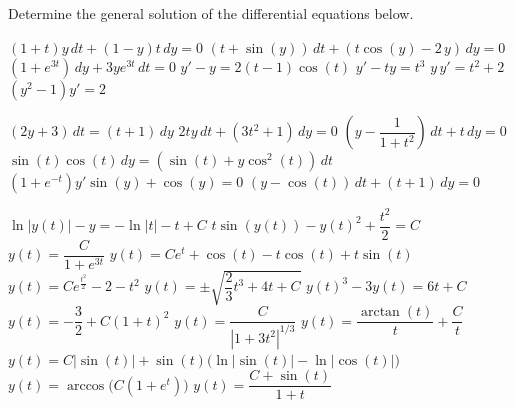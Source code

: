 \begin{Exercise} Determine the general solution of the differential equations below.
\begin{multicols}{2}

    \Question $\left( 1 + t \right) y \, d t + ( 1 - y ) t\, d y = 0$
    \Question $(t+\sin (y))\,d t+(t\cos (y) -2\,y)\,dy=0$
    \Question $\left( 1 + e^{3t} \right) \, d y + 3 y e^{3t}\, d t = 0$
    \Question $y'-y=2(t-1)\cos (t)$
\Question $y' - t y = t^3$
    \Question $y\,y'=t^2+2$
    \Question $\left(y^2-1\right) y'=2$

\Question $( 2 y + 3 ) \, d t = ( t + 1 ) \, d y$
\Question $2 t y \, d t + \left( 3 t^2 + 1 \right) \, d y = 0$
\Question $\left( y - \dfrac{1}{1 + t^2} \right) \, d t + t \, d y = 0 $
\Question $\sin  (t)  \cos  (t) \, d y = \left( \sin  (t) + y \cos ^2 (t) \right) \, d t$
\Question $\left(1 + e^{-t}\right) y' \sin (y) + \cos (y) = 0$
\Question $\left( y - \cos  (t) \right) \, d t + \left( t + 1 \right) \, d y = 0$
\EndCurrentQuestion
    
\end{multicols}
\end{Exercise}

\begin{Answer}\phantom{}
    \begin{multicols}{2}
        \Question $\ln|y(t)|- y = -\ln|t| - t + C$ %
        \Question $t \sin(y(t)) - y(t)^2 + \dfrac{t^2}{2} = C$
        \Question $y(t) = \dfrac{C}{1 + e^{3t}}$
        \Question $y(t) = Ce^{t} + \cos(t) - t\cos(t) + t\sin(t)$
        \Question $y(t) = Ce^{\frac{t^2}{2}} - 2 - t^2$
        \Question $y(t) = \pm \sqrt{\dfrac{2}{3}t^3 + 4t + C}$
        \Question $y(t)^3-3y(t) = 6t + C$
        \Question $y(t) = -\dfrac{3}{2} + C(1+t)^2$
        \Question $y(t) = \dfrac{C}{|1+3t^2|^{1/3}}$
        \Question $y(t) = \dfrac{\arctan(t)}{t} +  \dfrac{C}{t}$
        \Question $y(t) = C|\sin(t)| + \sin(t)\Big( \ln\big|\sin(t)\big| - \ln\big|\cos(t)\big| \big)$
        \Question $y(t) = \arccos\Big( C\left(1+e^{t}\right) \Big)$
        \Question $y(t) = \dfrac{C+\sin(t)}{1+t}$
        \EndCurrentQuestion
    \end{multicols}
\end{Answer}

